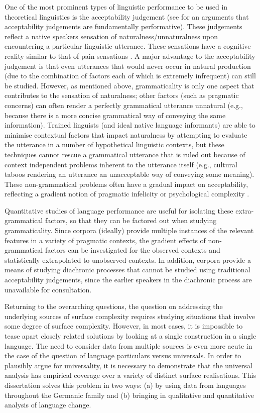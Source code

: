 One of the most prominent types of linguistic performance to be used in theoretical linguistics is the acceptability judgement (see \citealt{Stroud.2012,Phillips.2013, Phillips.2013b, Phillips.2013c} for an arguments that acceptability judgements are fundamentally performative). These judgements reflect a native speakers sensation of naturalness/unnaturalness upon encountering a particular linguistic utterance. These sensations have a cognitive reality similar to that of pain sensations \citep{Schutze.2014}. A major advantage to the acceptability judgement is that even utterances that would never occur in natural production (due to the combination of factors each of which is extremely infrequent) can still be studied. However, as mentioned above, grammaticality is only one aspect that contributes to the sensation of naturalness; other factors (such as pragmatic concerns) can often render a perfectly grammatical utterance unnatural (e.g., because there is a more concise grammatical way of conveying the same information). Trained linguists (and ideal native language informants) are able to minimise contextual factors that impact naturalness by attempting to evaluate the utterance in a number of hypothetical linguistic contexts, but these techniques cannot rescue a grammatical utterance that is ruled out because of context independent problems inherent to the utterance itself (e.g., cultural taboos rendering an utterance an unacceptable way of conveying some meaning). These non-grammatical problems often have a gradual impact on acceptability, reflecting a gradient notion of pragmatic infelicity or psychological complexity \citep{Bresnan.2007,Bresnan.2010,Schutze.2014}.

Quantitative studies of language performance are useful for isolating these extra-grammatical factors, so that they can be factored out when studying grammaticality. Since corpora (ideally) provide multiple instances of the relevant features in a variety of pragmatic contexts, the gradient effects of non-grammatical factors can be investigated for the observed contexts and statistically extrapolated to unobserved contexts. In addition, corpora provide a means of studying diachronic processes that cannot be studied using traditional acceptability judgements, since the earlier speakers in the diachronic process are unavailable for consultation. 


Returning to the overarching questions, the question on addressing the underlying sources of surface complexity requires studying situations that involve some degree of surface complexity. However, in most cases, it is impossible to tease apart closely related solutions by looking at a single construction in a single language. The need to consider data from multiple sources is even more acute in the case of the question of language particulars versus universals. In order to plausibly argue for universality, it is necessary to demonstrate that the universal analysis has empirical coverage over a variety of distinct surface realisations. This dissertation solves this problem in two ways: (a) by using data from languages throughout the Germanic family and (b) bringing in qualitative and quantitative analysis of language change.

